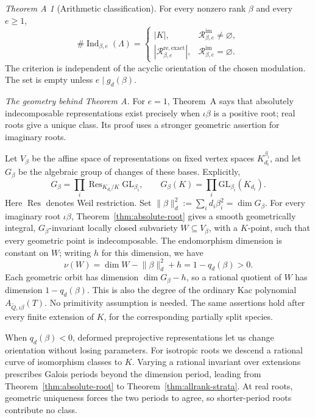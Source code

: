 \documentclass[11pt, reqno]{amsart}
\numberwithin{equation}{section}
\theoremstyle{definition}
\theoremstyle{remark}
\newtheorem*{theoremA}{Theorem A}
\newcommand{\op}[1]{\operatorname{#1}}
\newcommand{\mr}[1]{\mathrm{#1}}
\newcommand{\ms}[1]{\mathscr{#1}}
\newcommand{\Ind}{\op{Ind}}
\newcommand{\Res}{\op{Res}}
\newcommand{\Qbar}{\widetilde Q}
\begin{document}
\begin{theoremA}[Arithmetic classification]
For every nonzero rank $\beta$ and every $e\ge1$,
\[
\#\Ind_{\beta,e}(\Lambda)=
\begin{cases}
|K|,&\ms R^{\mr{im}}_{\beta,e}\ne\varnothing,\\[2pt]
|\ms R^{\mr{re,exact}}_{\beta,e}|,
 &\ms R^{\mr{im}}_{\beta,e}=\varnothing.
\end{cases}
\]
The criterion is independent of the acyclic orientation of the chosen
modulation. The set is empty unless $e\mid g_d(\beta)$.
\end{theoremA}

\noindent\emph{The geometry behind Theorem A.}
For $e=1$, Theorem~A says that absolutely indecomposable representations
exist precisely when $\iota\beta$ is a positive root; real roots give a
unique class. Its proof uses a stronger geometric assertion for
imaginary roots.

Let $V_\beta$ be the affine space of representations
on fixed vertex spaces $K_{d_i}^{\beta_i}$, and let $G_\beta$ be the
algebraic group of changes of these bases. Explicitly,
\[ G_\beta=\prod_i\Res_{K_{d_i}/K}\mr{GL}_{\beta_i},\qquad G_\beta(K)=\prod_i\mr{GL}_{\beta_i}(K_{d_i}). \]
Here $\Res$ denotes Weil restriction.
Set $\lVert\beta\rVert_d^2:=\sum_i d_i\beta_i^2=\dim G_\beta$. For every imaginary root $\iota\beta$, Theorem~\ref{thm:absolute-root}
gives a smooth geometrically integral, $G_\beta$-invariant locally closed
subvariety $W\subseteq V_\beta$, with a $K$-point, such that every
geometric point is indecomposable. The endomorphism dimension is constant
on $W$; writing $h$ for this dimension, we have
\[ \nu(W)=\dim W-\lVert\beta\rVert_d^2+h=1-q_d(\beta)>0. \]
Each geometric orbit has dimension $\dim G_\beta-h$, so a rational
quotient of $W$ has dimension $1-q_d(\beta)$. This is also the degree
of the ordinary Kac polynomial $A_{\Qbar,\iota\beta}(T)$.
No primitivity assumption is needed. The same assertions hold after
every finite extension of $K$, for the corresponding partially split
species.

When $q_d(\beta)<0$, deformed preprojective representations let us
change orientation without losing parameters. For isotropic roots we
descend a rational curve of isomorphism classes to $K$. Varying a rational invariant
over extensions prescribes Galois periods beyond the dimension period, leading from Theorem~\ref{thm:absolute-root} to
Theorem~\ref{thm:allrank-strata}. At real roots, geometric uniqueness
forces the two periods to agree, so shorter-period roots contribute no
class.
\end{document}
